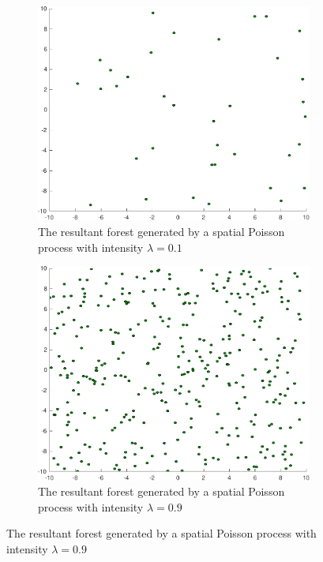 \begin{figure}
  \begin{subfigure}[b]{0.5\textwidth}
    \includegraphics[width=\textwidth]{figures/experiments/poisson009}
    \caption{The resultant forest generated by a spatial Poisson process with
      intensity \(\lambda = 0.1\)}
    \label{fig:poisson009}
  \end{subfigure}%
  \;
  \begin{subfigure}[b]{0.5\textwidth}
    \includegraphics[width=\textwidth]{figures/experiments/poisson09}
    \caption{The resultant forest generated by a spatial Poisson process with
      intensity \(\lambda = 0.9\)}
    \label{fig:poisson09}
  \end{subfigure}
\end{figure}

